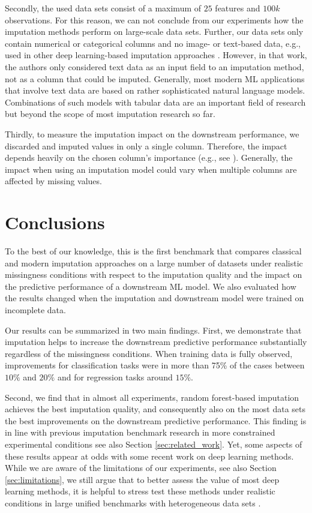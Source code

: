 \documentclass[utf8]{frontiersSCNS} %
\begin{document}
Secondly, the used data sets consist of a maximum of $25$ features and $100k$ observations. For this reason, we can not conclude from our experiments how the imputation methods perform on large-scale data sets. Further, our data sets only contain numerical or categorical columns and no image- or text-based data, e.g., used in other deep learning-based imputation approaches \citep{Biessmann2018a}. However, in that work, the authors only considered text data as an input field to an imputation method, not as a column that could be imputed. Generally, most modern ML applications that involve text data are based on rather sophisticated natural language models. Combinations of such models with tabular data are an important field of research \citep{Yin2020} but beyond the scope of most imputation research so far.

Thirdly, to measure the imputation impact on the downstream performance, we discarded and imputed values in only a single column. Therefore, the impact depends heavily on the chosen column's importance (e.g., see \cite{Jenga}). Generally, the impact when using an imputation model could vary when multiple columns are affected by missing values.



\section{Conclusions}
\label{sec:conclusion}
%
To the best of our knowledge, this is the first benchmark that compares classical and modern imputation approaches on a large number of datasets under realistic missingness conditions with respect to the imputation quality and the impact on the predictive performance of a downstream ML model. We also evaluated how the results changed when the imputation and downstream model were trained on incomplete data.

Our results can be summarized in two main findings. First, we demonstrate that imputation helps to increase the downstream predictive performance substantially regardless of the missingness conditions. When training data is fully observed, improvements for classification tasks were in more than 75\% of the cases between $10\%$ and $20\%$ and for regression tasks around $15\%$.

Second, we find that in almost all experiments, random forest-based imputation achieves the best imputation quality, and consequently also on the most data sets the best improvements on the downstream predictive performance. This finding is in line with previous imputation benchmark research in more constrained experimental conditions see also Section \ref{sec:related_work}. Yet, some aspects of these results appear at odds with some recent work on deep learning methods. While we are aware of the limitations of our experiments, see also Section \ref{sec:limitations}, we still argue that to better assess the value of most deep learning methods, it is helpful to stress test these methods under realistic conditions in large unified benchmarks with heterogeneous data sets \citep{Sculley2018, Bender2021}.
\end{document}
